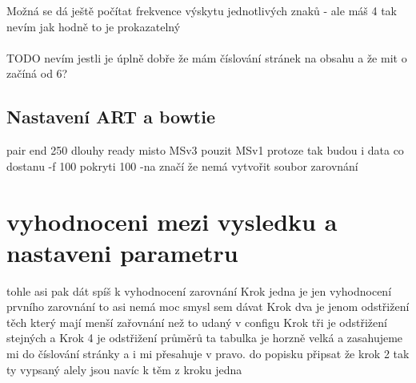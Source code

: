 \documentclass[czech,DP]{thesiskiv}
\numberwithin{equation}{section}
\begin{document}
Možná se dá ještě počítat frekvence výskytu jednotlivých znaků - ale máš 4 tak nevím jak hodně to je prokazatelný
\\
\\
TODO nevím jestli je úplně dobře že mám číslování stránek na obsahu a že mit o začíná od 6?
\section{Nastavení ART a bowtie}

pair end
250 dlouhy ready
misto MSv3 pouzit MSv1 protoze tak budou i data co dostanu
-f 100 pokryti 100
-na značí že nemá vytvořit soubor zarovnání
\chapter{vyhodnoceni mezi vysledku a nastaveni parametru}
tohle asi pak dát spíš k vyhodnocení zarovnání
Krok jedna je jen vyhodnocení prvního zarovnání to asi nemá moc smysl sem dávat
Krok dva je jenom odstřižení těch který mají menší zařovnání než to udaný v configu 
Krok tři je odstřižení stejných a 
Krok 4 je odstřižení průměrů 
ta tabulka je horzně velká a zasahujeme mi do číslování stránky a i mi přesahuje v pravo.
do popisku připsat že krok 2 tak ty vypsaný alely jsou navíc k těm z kroku jedna
\end{document}
